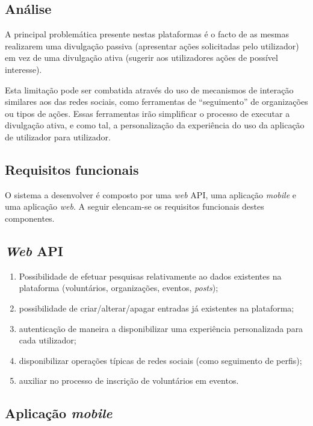 \subsection{Análise}
A principal problemática presente nestas plataformas é o facto de as mesmas realizarem uma divulgação passiva (apresentar ações solicitadas pelo utilizador) em vez de uma divulgação ativa (sugerir aos utilizadores ações de possível interesse). \par \bigskip
Esta limitação pode ser combatida através do uso de mecanismos de interação similares aos das redes sociais, como ferramentas de “seguimento” de organizações ou tipos de ações. Essas ferramentas irão simplificar o processo de executar a divulgação ativa, e como tal, a personalização da experiência do uso da aplicação de utilizador para utilizador. \par \bigskip

\subsection{Requisitos funcionais}

O sistema a desenvolver é composto por uma \textit{web} API, uma aplicação \textit{mobile} e uma aplicação \textit{web}. A seguir elencam-se os requisitos funcionais destes componentes.

\subsection*{\textit{Web} API}

\begin{enumerate}
	\item Possibilidade de efetuar pesquisas relativamente ao dados existentes na plataforma (voluntários, organizações, eventos, \textit{posts});
	\item possibilidade de criar/alterar/apagar entradas já existentes na plataforma;
	\item autenticação de maneira a disponibilizar uma experiência personalizada para cada utilizador;
	\item disponibilizar operações típicas de redes sociais (como seguimento de perfis);
	\item auxiliar no processo de inscrição de voluntários em eventos.
\end{enumerate}

\subsection*{Aplicação \textit{mobile}}

